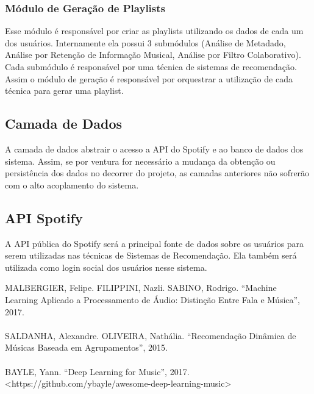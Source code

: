\documentclass[
	12pt,				%
    oneside,			%
	a4paper,			%
	english,			%
	french,				%
	spanish,			%
	brazil,				%
	]{abntex2}
\begin{document}
\subsubsection{Módulo de Geração de Playlists}
Esse módulo é responsável por criar as playlists utilizando os dados de cada um dos usuários.
Internamente ela possui 3 submódulos (Análise de Metadado, Análise por Retenção de Informação Musical, Análise por Filtro Colaborativo). 
Cada submódulo é responsável por uma técnica de sistemas de recomendação. Assim o módulo de geração é responsável por orquestrar a utilização de cada técnica para gerar uma playlist.


\subsection{Camada de Dados}
A camada de dados abstrair o acesso a API do Spotify e ao banco de dados dos sistema. Assim, se por ventura for necessário a mudança da obtenção ou persistência dos dados no decorrer do projeto, as camadas anteriores não sofrerão com o alto acoplamento do sistema.

\subsection{API Spotify}
A API pública do Spotify será a principal fonte de dados sobre os usuários para serem utilizadas nas técnicas de Sistemas de Recomendação. Ela também será utilizada como login social dos usuários nesse sistema.


\postextual


MALBERGIER, Felipe. FILIPPINI, Nazli. SABINO, Rodrigo. “Machine Learning Aplicado a Processamento de Áudio: Distinção Entre Fala e Música”, 2017.\\\\
SALDANHA, Alexandre. OLIVEIRA, Nathália. “Recomendação Dinâmica de Músicas Baseada em Agrupamentos”, 2015.\\\\
BAYLE, Yann. “Deep Learning for Music”, 2017. <https://github.com/ybayle/awesome-deep-learning-music>
\end{document}

